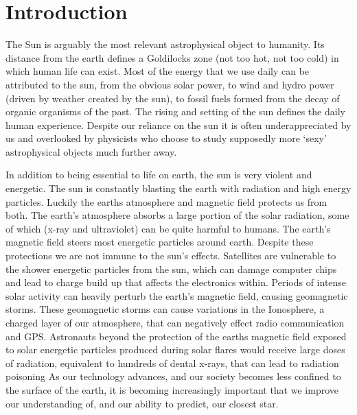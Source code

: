 \chapter{Introduction}\label{CH:introduction}


The Sun is arguably the most relevant astrophysical object to humanity.
Its distance from the earth defines a Goldilocks zone (not too hot, not too cold) in which human life can exist.
Most of the energy that we use daily can be attributed to the sun, from the obvious solar power, to wind and hydro power (driven by weather created by the sun), to fossil fuels formed from the decay of organic organisms of the past.
The rising and setting of the sun defines the daily human experience.
Despite our reliance on the sun it is often underappreciated by us and overlooked by physicists who choose to study supposedly more `sexy' astrophysical objects much further away.

In addition to being essential to life on earth, the sun is very violent and energetic.
The sun is constantly blasting the earth with radiation and high energy particles.
Luckily the earths atmosphere and magnetic field protects us from both.
The earth's atmosphere absorbs a large portion of the solar radiation, some of which (x-ray and ultraviolet) can be quite harmful to humans.
The earth's magnetic field steers most energetic particles around earth.
Despite these protections we are not immune to the sun's effects.
Satellites are vulnerable to the shower energetic particles from the sun, which can damage computer chips and lead to charge build up that affects the electronics within.
Periods of intense solar activity can heavily perturb the earth's magnetic field, causing geomagnetic storms.
These geomagnetic storms can cause variations in the Ionosphere, a charged layer of our atmosphere, that can negatively effect radio communication and GPS.
Astronauts beyond the protection of the earths magnetic field exposed to solar energetic particles produced during solar flares would receive large doses of radiation, equivalent to hundreds of dental x-rays, that can lead to radiation poisoning \citep[][and references therein]{Temmer2021}
As our technology advances, and our society becomes less confined to the surface of the earth, it is becoming increasingly important that we improve our understanding of, and our ability to predict, our closest star.


